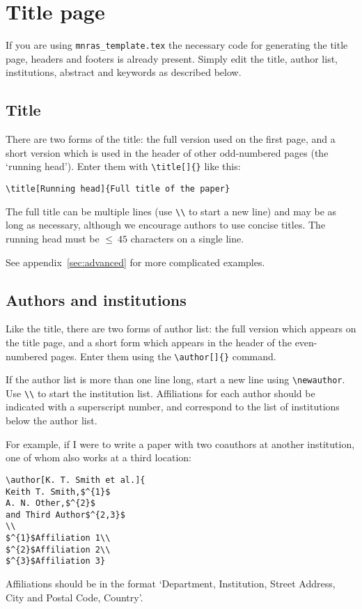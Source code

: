 \documentclass[fleqn,usenatbib,useAMS]{mnras}
\begin{document}
\section{Title page}

If you are using \texttt{mnras\_template.tex} the necessary code for generating the title page, headers and footers is already present.
Simply edit the title, author list, institutions, abstract and keywords as described below.

\subsection{Title}
There are two forms of the title: the full version used on the first page, and a short version which is used in the header of other odd-numbered pages (the `running head').
Enter them with \verb'\title[]{}' like this:
\begin{verbatim}
\title[Running head]{Full title of the paper}
\end{verbatim}
The full title can be multiple lines (use \verb'\\' to start a new line) and may be as long as necessary, although we encourage authors to use concise titles. The running head must be $\le~45$ characters on a single line.

See appendix~\ref{sec:advanced} for more complicated examples.

\subsection{Authors and institutions}

Like the title, there are two forms of author list: the full version which appears on the title page, and a short form which appears in the header of the even-numbered pages. Enter them using the \verb'\author[]{}' command.

If the author list is more than one line long, start a new line using \verb'\newauthor'. Use \verb'\\' to start the institution list. Affiliations for each author should be indicated with a superscript number, and correspond to the list of institutions below the author list.

For example, if I were to write a paper with two coauthors at another institution, one of whom also works at a third location:
\begin{verbatim}
\author[K. T. Smith et al.]{
Keith T. Smith,$^{1}$
A. N. Other,$^{2}$
and Third Author$^{2,3}$
\\
$^{1}$Affiliation 1\\
$^{2}$Affiliation 2\\
$^{3}$Affiliation 3}
\end{verbatim}
Affiliations should be in the format `Department, Institution, Street Address, City and Postal Code, Country'.
\end{document}
